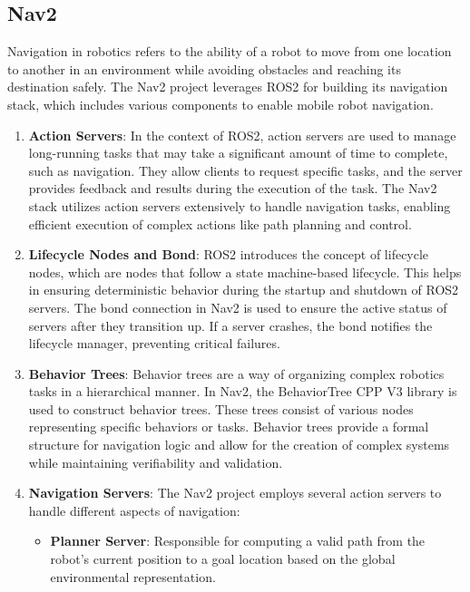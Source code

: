 \subsection{Nav2}
Navigation in robotics refers to the ability of a robot to move from one location to another in an environment while avoiding obstacles and reaching its destination safely. The Nav2 project leverages ROS2 for building its navigation stack, which includes various components to enable mobile robot navigation.

\begin{enumerate}
    \item \textbf{Action Servers}: In the context of ROS2, action servers are used to manage long-running tasks that may take a significant amount of time to complete, such as navigation. They allow clients to request specific tasks, and the server provides feedback and results during the execution of the task. The Nav2 stack utilizes action servers extensively to handle navigation tasks, enabling efficient execution of complex actions like path planning and control.

    \item \textbf{Lifecycle Nodes and Bond}: ROS2 introduces the concept of lifecycle nodes, which are nodes that follow a state machine-based lifecycle. This helps in ensuring deterministic behavior during the startup and shutdown of ROS2 servers. The bond connection in Nav2 is used to ensure the active status of servers after they transition up. If a server crashes, the bond notifies the lifecycle manager, preventing critical failures.

    \item \textbf{Behavior Trees}: Behavior trees are a way of organizing complex robotics tasks in a hierarchical manner. In Nav2, the BehaviorTree CPP V3 library is used to construct behavior trees. These trees consist of various nodes representing specific behaviors or tasks. Behavior trees provide a formal structure for navigation logic and allow for the creation of complex systems while maintaining verifiability and validation.

    \item \textbf{Navigation Servers}: The Nav2 project employs several action servers to handle different aspects of navigation:
    \begin{itemize}
        \item \textbf{Planner Server}: Responsible for computing a valid path from the robot's current position to a goal location based on the global environmental representation.
        

\end{itemize}
\end{enumerate}
